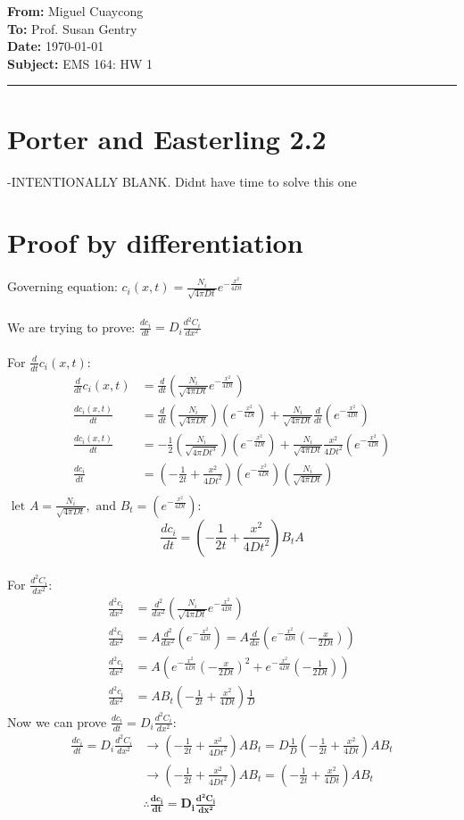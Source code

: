 \documentclass[11pt]{article}
\newcommand{\memoheader}[4]{
  \noindent
  \textbf{From:} #2\\ 
  \textbf{To:} #1\\
  \textbf{Date:} #3\\
  \textbf{Subject:} #4\\[1ex]\hrule\vspace{1.5ex}
}
\begin{document}
\memoheader{Prof. Susan Gentry}
            {Miguel Cuaycong}
            {\today}
            {EMS 164: HW 1}
\section{Porter and Easterling 2.2}
-INTENTIONALLY BLANK. Didnt have time to solve this one
\section{Proof by differentiation}
Governing equation: $c_i(x,t) = \frac{N_i}{\sqrt{4 \pi Dt}}e^{-\frac{x^2}{4Dt}}$
\\~\\
We are trying to prove: $\frac{dc_i}{dt} = D_i\frac{d^2C_i}{dx^2}$
\\~\\
For $\frac{d}{dt}c_i(x,t)$:
\begin{align*}
  \frac{d}{dt}c_i(x,t) &= \frac{d}{dt}(\frac{N_i}{\sqrt{4 \pi Dt}}e^{-\frac{x^2}{4Dt}})
  \\
  \frac{dc_i(x,t)}{dt} &= \frac{d}{dt}(\frac{N_i}{\sqrt{4 \pi Dt}})(e^{-\frac{x^2}{4Dt}}) + \frac{N_i}{\sqrt{4 \pi Dt}}\frac{d}{dt}(e^{-\frac{x^2}{4Dt}})
  \\
  \frac{dc_i(x,t)}{dt} &= -\frac{1}{2}(\frac{N_i}{\sqrt{4 \pi Dt^3}})(e^{-\frac{x^2}{4Dt}}) + \frac{N_i}{\sqrt{4 \pi Dt}}\frac{x^2}{4Dt^2}(e^{-\frac{x^2}{4Dt}})
  \\
  \frac{dc_i}{dt} &= (-\frac{1}{2t}+\frac{x^2}{4Dt^2})(e^{-\frac{x^2}{4Dt}})(\frac{N_i}{\sqrt{4 \pi Dt}}) 
  \\
  \end{align*}
  $\text{ let } A = \frac{N_i}{\sqrt{4 \pi Dt}},  \text{ and } B_t = (e^{-\frac{x^2}{4Dt}})$: 
  $$\frac{dc_i}{dt} = (-\frac{1}{2t}+\frac{x^2}{4Dt^2})B_tA$$
  \\

For $\frac{d^2C_i}{dx^2}$:
\begin{align*}
  \frac{d^2c_i}{dx^2} &= \frac{d^2}{dx^2}(\frac{N_i}{\sqrt{4 \pi Dt}}e^{-\frac{x^2}{4Dt}})
  \\
  \frac{d^2c_i}{dx^2} &= A\frac{d^2}{dx^2}(e^{-\frac{x^2}{4Dt}}) = A\frac{d}{dx}(e^{-\frac{x^2}{4Dt}}(-\frac{x}{2Dt}))
  \\
  \frac{d^2c_i}{dx^2} &= A(e^{-\frac{x^2}{4Dt}}(-\frac{x}{2Dt})^2+e^{-\frac{x^2}{4Dt}}(-\frac{1}{2Dt}))
  \\
  \frac{d^2c_i}{dx^2} &= AB_t(-\frac{1}{2t}+\frac{x^2}{4Dt})\frac{1}{D}
\end{align*}
Now we can prove $\frac{dc_i}{dt} = D_i\frac{d^2C_i}{dx^2}$:
\begin{align*}
  \frac{dc_i}{dt} = D_i\frac{d^2C_i}{dx^2} &\rightarrow (-\frac{1}{2t}+\frac{x^2}{4Dt^2})AB_t = D\frac{1}{D}(-\frac{1}{2t}+\frac{x^2}{4Dt})AB_t
  \\
  &\rightarrow (-\frac{1}{2t}+\frac{x^2}{4Dt^2})AB_t = (-\frac{1}{2t}+\frac{x^2}{4Dt})AB_t
  \\
  &\mathbf{\therefore \frac{dc_i}{dt} = D_i\frac{d^2C_i}{dx^2}}
\end{align*}
\end{document}
